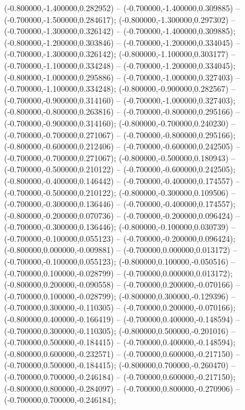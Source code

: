  (-0.800000,-1.400000,0.282952) -- (-0.700000,-1.400000,0.309885) -- (-0.700000,-1.500000,0.284617);
 (-0.800000,-1.300000,0.297302) -- (-0.700000,-1.300000,0.326142) -- (-0.700000,-1.400000,0.309885);
 (-0.800000,-1.200000,0.303846) -- (-0.700000,-1.200000,0.334045) -- (-0.700000,-1.300000,0.326142);
 (-0.800000,-1.100000,0.303177) -- (-0.700000,-1.100000,0.334248) -- (-0.700000,-1.200000,0.334045);
 (-0.800000,-1.000000,0.295886) -- (-0.700000,-1.000000,0.327403) -- (-0.700000,-1.100000,0.334248);
 (-0.800000,-0.900000,0.282567) -- (-0.700000,-0.900000,0.314160) -- (-0.700000,-1.000000,0.327403);
 (-0.800000,-0.800000,0.263816) -- (-0.700000,-0.800000,0.295166) -- (-0.700000,-0.900000,0.314160);
 (-0.800000,-0.700000,0.240230) -- (-0.700000,-0.700000,0.271067) -- (-0.700000,-0.800000,0.295166);
 (-0.800000,-0.600000,0.212406) -- (-0.700000,-0.600000,0.242505) -- (-0.700000,-0.700000,0.271067);
 (-0.800000,-0.500000,0.180943) -- (-0.700000,-0.500000,0.210122) -- (-0.700000,-0.600000,0.242505);
 (-0.800000,-0.400000,0.146442) -- (-0.700000,-0.400000,0.174557) -- (-0.700000,-0.500000,0.210122);
 (-0.800000,-0.300000,0.109506) -- (-0.700000,-0.300000,0.136446) -- (-0.700000,-0.400000,0.174557);
 (-0.800000,-0.200000,0.070736) -- (-0.700000,-0.200000,0.096424) -- (-0.700000,-0.300000,0.136446);
 (-0.800000,-0.100000,0.030739) -- (-0.700000,-0.100000,0.055123) -- (-0.700000,-0.200000,0.096424);
 (-0.800000,0.000000,-0.009881) -- (-0.700000,0.000000,0.013172) -- (-0.700000,-0.100000,0.055123);
 (-0.800000,0.100000,-0.050516) -- (-0.700000,0.100000,-0.028799) -- (-0.700000,0.000000,0.013172);
 (-0.800000,0.200000,-0.090558) -- (-0.700000,0.200000,-0.070166) -- (-0.700000,0.100000,-0.028799);
 (-0.800000,0.300000,-0.129396) -- (-0.700000,0.300000,-0.110305) -- (-0.700000,0.200000,-0.070166);
 (-0.800000,0.400000,-0.166419) -- (-0.700000,0.400000,-0.148594) -- (-0.700000,0.300000,-0.110305);
 (-0.800000,0.500000,-0.201016) -- (-0.700000,0.500000,-0.184415) -- (-0.700000,0.400000,-0.148594);
 (-0.800000,0.600000,-0.232571) -- (-0.700000,0.600000,-0.217150) -- (-0.700000,0.500000,-0.184415);
 (-0.800000,0.700000,-0.260470) -- (-0.700000,0.700000,-0.246184) -- (-0.700000,0.600000,-0.217150);
 (-0.800000,0.800000,-0.284097) -- (-0.700000,0.800000,-0.270906) -- (-0.700000,0.700000,-0.246184);
